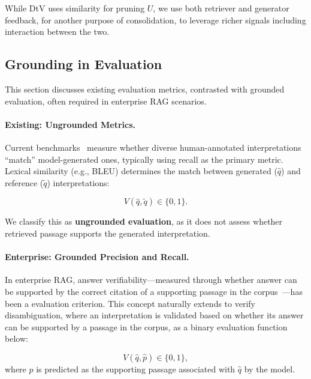 While DtV uses similarity for pruning $U$, 
we use both retriever and generator feedback, for another purpose of consolidation, to leverage richer signals including interaction between the two.






\subsection{Grounding in Evaluation}
\label{subsec:eval}

This section discusses existing  evaluation metrics, contrasted with
 grounded evaluation, often required  in enterprise RAG scenarios.
 

\paragraph{Existing: Ungrounded Metrics.}
Current benchmarks~\citep{min-etal-2020-ambigqa, stelmakh-etal-2022-asqa} measure whether diverse human-annotated interpretations ``match''  model-generated ones, typically using recall as the primary metric. Lexical similarity (e.g., BLEU) determines the match between generated ($\hat{q}$) and reference ($\tilde{q}$) interpretations:

\begin{equation}
V(\hat{q},\tilde{q}) \in \{0,1\}.
\label{eq:simple_match}
\end{equation}

We classify this as \textbf{ungrounded evaluation}, as it does not assess whether retrieved passage supports the generated interpretation.

\paragraph{Enterprise: Grounded Precision and Recall.}

In enterprise RAG, answer verifiability—measured through whether answer can be supported by the correct citation of a supporting passage in the corpus~\citep{li-etal-2023-survey-arxiv, liu-etal-2023-evaluating}—has been a  evaluation criterion. This concept naturally extends to verify disambiguation, where an interpretation is validated based on whether its answer can be supported by a passage in the corpus, as a binary evaluation function below:

\begin{equation}
V(\hat{q},\hat{p}) \in \{0,1\},
\end{equation}
where  $\hat{p}$
is predicted as the supporting passage associated with $\hat{q}$ by the model.










